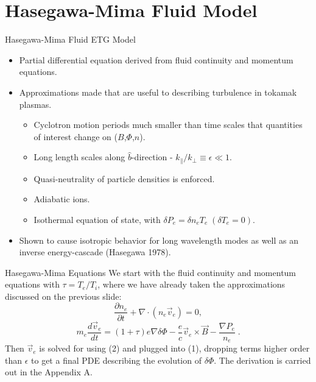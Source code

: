 \documentclass[aspectratio=43]{beamer}
\begin{document}
   \section{Hasegawa-Mima Fluid Model}

   \begin{frame}{Hasegawa-Mima Fluid ETG Model}
      \begin{itemize}
         \item Partial differential equation derived from fluid continuity and momentum equations.
         \item Approximations made that are useful to describing  turbulence in tokamak plasmas.
         \begin{itemize}
            \item Cyclotron motion periods much smaller than time scales that quantities of interest change on ($B$,$\Phi$,$n$).
            \item Long length scales along $\hat{b}$-direction - $k_{\parallel}/k_{\perp}\equiv\epsilon\ll1$.
            \item Quasi-neutrality of particle densities is enforced.
            \item Adiabatic ions.
            \item Isothermal equation of state, with $\delta P_e = \delta n_eT_e\;(\delta T_e=0)$.
         \end{itemize}
         \item Shown to cause isotropic behavior for long wavelength modes as well as an inverse energy-cascade (Hasegawa 1978).
      \end{itemize}
   \end{frame}

   \begin{frame}{Hasegawa-Mima Equations}
      \quad We start with the fluid continuity and momentum equations with $\tau = T_e/T_i$, where we have already taken the approximations discussed
   on the previous slide:
      \begin{equation}
         \frac{\partial n_e}{\partial t} + \nabla\cdot\left(n_e\vec{v}_e\right) = 0,
      \end{equation}
      \begin{equation}
            m_e\frac{d\vec{v}_e}{dt} = \left(1+\tau\right)e\nabla\delta\Phi - \frac{e}{c}\vec{v}_e\times\vec{B}-\frac{\nabla P_e}{n_e}\;.
      \end{equation}
      \quad Then $\vec{v}_e$ is solved for using (2) and plugged into (1), dropping terms higher order than $\epsilon$
      to get a final PDE describing the evolution of $\delta\Phi$. The derivation is carried out in the Appendix A.
   \end{frame}
\end{document}
